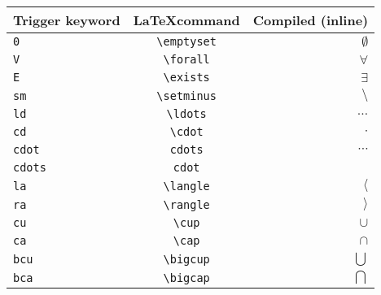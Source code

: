\documentclass[a4paper,11pt]{scrartcl}
\begin{document}
\thispagestyle{plain}
\begin{table}[tb]
  \begin{center}
    \begin{tabular}{lcr}
    \hline
    \multicolumn{1}{c}{\bf Trigger keyword}    &    \multicolumn{1}{c}{\bf \LaTeX command}    &    \multicolumn{1}{c}{\bf Compiled (inline)}   \\
    \hline
    \verb|0|                                   &    \verb|\emptyset|                          &    $\emptyset$  \\
    \verb|V|                                   &    \verb|\forall|                            &    $\forall$  \\
    \verb|E|                                   &    \verb|\exists|                            &    $\exists$  \\
    \verb|sm|                                  &    \verb|\setminus|                          &    $\setminus$  \\
    \verb|ld|                                  &    \verb|\ldots|                             &    $\ldots$  \\
    \verb|cd|                                  &    \verb|\cdot|                              &    $\cdot$  \\
    \verb|cdot|                                &    \verb|cdots|                              &    $\cdots$  \\
    \verb|cdots|                               &    \verb|cdot|                               &    $\mbox{}$  \\
    \verb|la|                                  &    \verb|\langle|                            &    $\langle$  \\
    \verb|ra|                                  &    \verb|\rangle|                            &    $\rangle$  \\
    \verb|cu|                                  &    \verb|\cup|                               &    $\cup$  \\
    \verb|ca|                                  &    \verb|\cap|                               &    $\cap$  \\
    \verb|bcu|                                 &    \verb|\bigcup|                            &    $\bigcup$  \\
    \verb|bca|                                 &    \verb|\bigcap|                            &    $\bigcap$  \\

\end{tabular}
\end{center}
\end{table}
\end{document}
